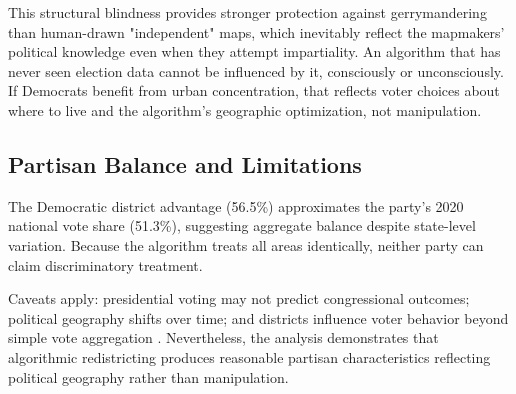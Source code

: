 This structural blindness provides stronger protection against gerrymandering than human-drawn "independent" maps, which inevitably reflect the mapmakers' political knowledge even when they attempt impartiality. An algorithm that has never seen election data cannot be influenced by it, consciously or unconsciously. If Democrats benefit from urban concentration, that reflects voter choices about where to live and the algorithm's geographic optimization, not manipulation.
\subsection{Partisan Balance and Limitations}

The Democratic district advantage (56.5\%) approximates the party's 2020 national vote share (51.3\%), suggesting aggregate balance despite state-level variation. Because the algorithm treats all areas identically, neither party can claim discriminatory treatment.

Caveats apply: presidential voting may not predict congressional outcomes; political geography shifts over time; and districts influence voter behavior beyond simple vote aggregation \cite{pegden2017computational}. Nevertheless, the analysis demonstrates that algorithmic redistricting produces reasonable partisan characteristics reflecting political geography rather than manipulation.
